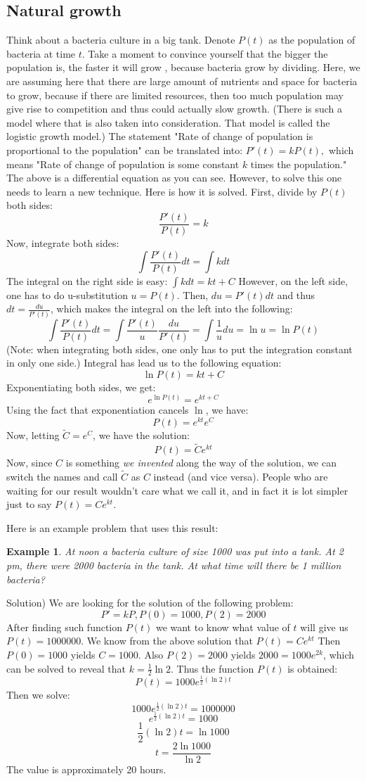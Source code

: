 \documentclass[12pt]{report}
\newtheorem{ex}{Example}[section]
\begin{document}
\subsection*{Natural growth}
Think about a bacteria culture in a big tank. Denote $P(t)$ as the population of bacteria at time $t$. Take a moment to convince yourself that the bigger the population is, the faster it will grow , because bacteria grow by dividing. Here, we are assuming here that there are large amount of nutrients and space for bacteria to grow, because if there are limited resources, then too much population may give rise to competition and thus could actually slow growth. (There is such a model where that is also taken into consideration. That model is called the logistic growth model.)
The statement "Rate of change of population is proportional to the population" can be translated into:
$P'(t)= k P(t),$
which means "Rate of change of population is some constant $k$ times the population." 
The above is a differential equation as you can see. However, to solve this one needs to learn a new technique. Here is how it is solved. First, divide by $P(t)$ both sides:
$$\frac{P'(t)}{P(t)} = k $$
Now, integrate both sides:
$$\int \frac{P'(t)}{P(t)} dt = \int k dt$$
The integral on the right side is easy: $\int k dt = kt + C$
However, on the left side, one has to do u-substitution $u= P(t)$. 
Then, $du = P'(t) dt$ and thus $dt = \frac{du}{P'(t)}$, which makes the integral on the left into the following:
$$\int \frac{P'(t)}{P(t)} dt = \int \frac{P'(t)}{u} \frac{du}{P'(t)} = \int \frac{1}{u} du = \ln u = \ln P(t) $$
(Note: when integrating both sides, one only has to put the integration constant in only one side.)
Integral has lead us to the following equation:
$$\ln P(t) = kt + C $$
Exponentiating both sides, we get:
$$ e^{\ln P(t)} = e^{kt + C}$$
Using the fact that exponentiation cancels $\ln$, we have:
$$ P(t) = e^{kt} e^C $$
Now, letting $\tilde{C}= e^C$, we have the solution:
$$ P(t) = \tilde{C} e^{kt} $$
Now, since $C$ is something \textit{we invented} along the way of the solution, we can switch the names and call $\tilde{C}$ as $C$ instead (and vice versa). People who are waiting for our result wouldn't care what we call it, and in fact it is lot simpler just to say $ P(t) = C e^{kt} $.

Here is an example problem that uses this result:
\begin{ex} At noon a bacteria culture of size 1000 was put into a tank. At 2 pm, there were 2000 bacteria in the tank. At what time will there be 1 million bacteria? \end{ex}
Solution) We are looking for the solution of the following problem:
$$P' = kP, P(0)=1000, P(2)=2000$$
After finding such function $P(t)$ we want to know what value of $t$ will give us $P(t)=1000000$. 
We know from the above solution that $P(t)= C e^{kt}$
Then $P(0)=1000$ yields $C=1000$. Also $P(2)=2000$ yields $2000=1000 e^{2k}$, which can be solved to reveal that $k= \frac{1}{2} \ln 2 $. Thus the function $P(t)$ is obtained:
$$P(t)= 1000 e^{\frac{1}{2} (\ln 2)t}$$
Then we solve:
$$1000 e^{\frac{1}{2} (\ln 2)t}=1000000$$
$$e^{\frac{1}{2} (\ln 2)t}=1000$$
$$\frac{1}{2} (\ln 2)t = \ln 1000$$
$$ t = \frac{2 \ln 1000}{\ln 2}$$
The value is approximately 20 hours.
 
\end{document}
